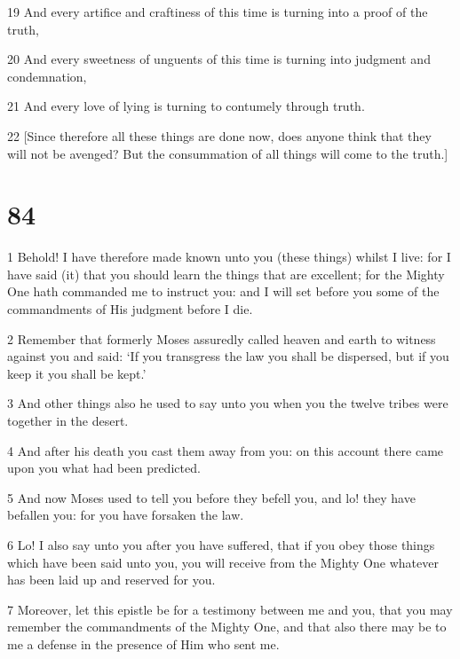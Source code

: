\par 19 And every artifice and craftiness of this time is turning into a proof of the truth,

\par 20 And every sweetness of unguents of this time is turning into judgment and condemnation,

\par 21 And every love of lying is turning to contumely through truth.

\par 22 [Since therefore all these things are done now, does anyone think that they will not be avenged? But the consummation of all things will come to the truth.]

\chapter{84}

\par 1 Behold! I have therefore made known unto you (these things) whilst I live: for I have said (it) that you should learn the things that are excellent; for the Mighty One hath commanded me to instruct you: and I will set before you some of the commandments of His judgment before I die. 

\par 2 Remember that formerly Moses assuredly called heaven and earth to witness against you and said: ‘If you transgress the law you shall be dispersed, but if you keep it you shall be kept.’

\par 3 And other things also he used to say unto you when you the twelve tribes were together in the desert. 

\par 4 And after his death you cast them away from you: on this account there came upon you what had been predicted. 

\par 5 And now Moses used to tell you before they befell you, and lo! they have befallen you: for you have forsaken the law. 

\par 6 Lo! I also say unto you after you have suffered, that if you obey those things which have been said unto you, you will receive from the Mighty One whatever has been laid up and reserved for you. 

\par 7 Moreover, let this epistle be for a testimony between me and you, that you may remember the commandments of the Mighty One, and that also there may be to me a defense in the presence of Him who sent me. 

